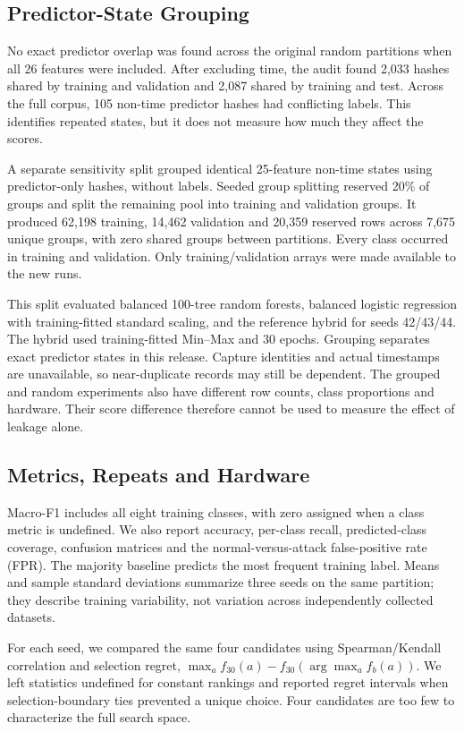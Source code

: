 \subsection{Predictor-State Grouping}
No exact predictor overlap was found across the original random partitions when all 26 features were included. After excluding time, the audit found 2,033 hashes shared by training and validation and 2,087 shared by training and test. Across the full corpus, 105 non-time predictor hashes had conflicting labels. This identifies repeated states, but it does not measure how much they affect the scores.

A separate sensitivity split grouped identical 25-feature non-time states using predictor-only hashes, without labels. Seeded group splitting reserved 20\% of groups and split the remaining pool into training and validation groups. It produced 62,198 training, 14,462 validation and 20,359 reserved rows across 7,675 unique groups, with zero shared groups between partitions. Every class occurred in training and validation. Only training/validation arrays were made available to the new runs.

This split evaluated balanced 100-tree random forests, balanced logistic regression with training-fitted standard scaling, and the reference hybrid for seeds 42/43/44. The hybrid used training-fitted Min--Max and 30 epochs. Grouping separates exact predictor states in this release. Capture identities and actual timestamps are unavailable, so near-duplicate records may still be dependent. The grouped and random experiments also have different row counts, class proportions and hardware. Their score difference therefore cannot be used to measure the effect of leakage alone.

\subsection{Metrics, Repeats and Hardware}
Macro-F1 includes all eight training classes, with zero assigned when a class metric is undefined. We also report accuracy, per-class recall, predicted-class coverage, confusion matrices and the normal-versus-attack false-positive rate (FPR). The majority baseline predicts the most frequent training label. Means and sample standard deviations summarize three seeds on the same partition; they describe training variability, not variation across independently collected datasets.

For each seed, we compared the same four candidates using Spearman/Kendall correlation and selection regret, $\max_a f_{30}(a)-f_{30}(\arg\max_a f_b(a))$. We left statistics undefined for constant rankings and reported regret intervals when selection-boundary ties prevented a unique choice. Four candidates are too few to characterize the full search space.

